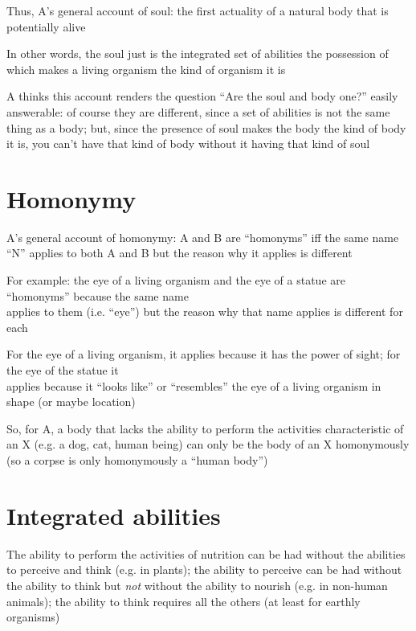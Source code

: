 \documentclass[11pt]{article}
\begin{document}
\noindent Thus, A's general account of soul: the first actuality of a natural body that is potentially alive
\vspace*{2mm}

\noindent In other words, the soul just is the integrated set of abilities the possession of which makes a living organism the kind of organism it is
\newpage

\noindent A thinks this account renders the question ``Are the soul and body one?'' easily answerable: of course they are different, since a set of abilities is not the same thing as a body; but, since the presence of soul makes the body the kind of body it is, you can't have that kind of body without it having that kind of soul

\section*{Homonymy}

\noindent A's general account of homonymy: A and B are ``homonyms'' iff the same name ``N'' applies to both A and B but the reason why it applies is different
\vspace*{2mm}

For example: the eye of a living organism and the eye of a statue are ``homonyms'' because the same name\\\hspace*{6mm}applies to them (i.e. ``eye'') but the reason why that name applies is different for each
\vspace*{1mm}

For the eye of a living organism, it applies because it has the power of sight; for the eye of the statue it\\\hspace*{6mm}applies because it ``looks like'' or ``resembles'' the eye of a living organism in shape (or maybe location)
\vspace*{2mm}

\noindent So, for A, a body that lacks the ability to perform the activities characteristic of an X (e.g. a dog, cat, human being) can only be the body of an X homonymously (so a corpse is only homonymously a ``human body'')

\section*{Integrated abilities}

\noindent The ability to perform the activities of nutrition can be had without the abilities to perceive and think (e.g. in plants); the ability to perceive can be had without the ability to think but \emph{not} without the ability to nourish (e.g. in non-human animals); the ability to think requires all the others (at least for earthly organisms)
\vspace*{2mm}
\end{document}
